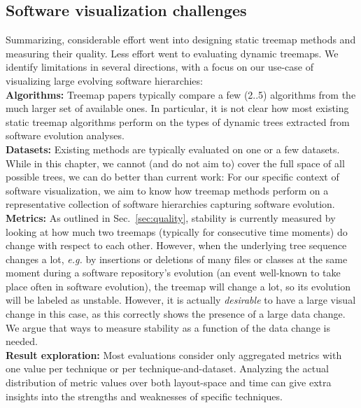 
\subsection{Software visualization challenges}
\label{sec:current_state}
%
%
Summarizing, considerable effort went into designing static treemap methods and measuring their quality. Less effort went to evaluating dynamic treemaps. We identify limitations in several directions, with a focus on our use-case of visualizing large evolving software hierarchies:\\

\noindent\textbf{Algorithms:} Treemap papers typically compare a few (2..5) algorithms from the much larger set of available ones. In particular, it is not clear how most existing static treemap algorithms perform on the types of dynamic trees extracted from software evolution analyses.\\

\noindent\textbf{Datasets:} Existing methods are typically evaluated on one or a few datasets. While in this chapter, we cannot (and do not aim to) cover the full space of all possible trees, we can do better than current work: For our specific context of software visualization, we aim to know how treemap methods perform on a representative collection of software hierarchies capturing software evolution.\\

\noindent\textbf{Metrics:} As outlined in Sec.~\ref{sec:quality}, stability is currently measured by looking at how much two treemaps (typically for consecutive time moments) do change with respect to each other. However, when the underlying tree sequence changes a lot, \emph{e.g.} by insertions or deletions of many files or classes at the same moment during a software repository's evolution (an event well-known to take place often in software evolution), the treemap will change a lot, so its evolution will be labeled as unstable. However, it is actually \emph{desirable} to have a large visual change in this case, as this correctly shows the presence of a large data change. We argue that ways to measure stability as a function of the data change is needed.\\

\noindent\textbf{Result exploration:} Most evaluations consider only aggregated metrics with one value per technique or per technique-and-dataset. Analyzing the actual distribution of metric values over both layout-space and time can give extra insights into the strengths and weaknesses of specific techniques.\\

